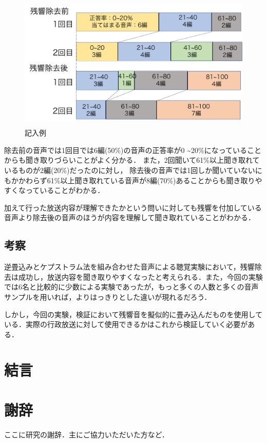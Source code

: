 \documentclass[a4j,11pt]{jsarticle}
\begin{document}
\begin{figure}[h]
\begin{center}
 \includegraphics[clip,width=130mm,height=65mm]{shitsumonkekka.pdf}
\end{center}
 \caption{記入例}
 \label{fig:kinyurei}
\end{figure}
除去前の音声では1回目では6編(50\%)の音声の正答率が0	\textasciitilde20\%になっていることからも聞き取りづらいことがよく分かる．
また，2回聞いて61\%以上聞き取れているものが2編(20\%)だったのに対し，
除去後の音声では1回しか聞いていないにもかかわらず61\%以上聞き取れている音声が8編(70\%)あることからも聞き取りやすくなっていることがわかる．

加えて行った放送内容が理解できたかという問いに対しても残響を付加している音声より除去後の音声のほうが内容を理解して聞き取れていることがわかる．
\newpage

\subsection{考察}
逆畳込みとケプストラム法を組み合わせた音声による聴覚実験において，残響除去は成功し，放送内容を聞き取りやすくなったと考えられる．また，今回の実験では6名と比較的に少数による実験であったが，もっと多くの人数と多くの音声サンプルを用いれば，よりはっきりとした違いが現れるだろう．

しかし，今回の実験，検証において残響音を擬似的に畳み込んだものを使用している．実際の行政放送に対して使用できるかはこれから検証していく必要がある．

\newpage
\section{結言}

\newpage
\section*{謝辞}
ここに研究の謝辞．主にご協力いただいた方など．
\end{document}
